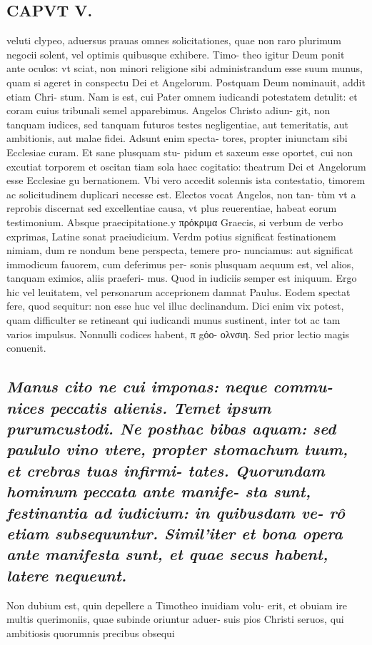 \documentclass{article}
\begin{document}
\begin{pages}
\section*{CAPVT V. }
\marginpar{[ p.69 ]}\pstart veluti clypeo, aduersus prauas omnes solicitationes, quae non raro plurimum negocii solent, vel optimis quibusque exhibere. Timo- theo igitur Deum ponit ante oculos: vt sciat, non minori religione sibi administrandum esse suum munus, quam si ageret in conspectu Dei et Angelorum. Postquam Deum nominauit, addit etiam Chri- stum. Nam is est, cui Pater omnem iudicandi potestatem detulit: et coram cuius tribunali semel apparebimus. Angelos Christo adiun- git, non tanquam iudices, sed tanquam futuros testes negligentiae, aut temeritatis, aut ambitionis, aut malae fidei. Adsunt enim specta- tores, propter iniunctam sibi Ecclesiae curam. Et sane plusquam stu- pidum et saxeum esse oportet, cui non excutiat torporem et oscitan tiam sola haec cogitatio: theatrum Dei et Angelorum esse Ecclesiae gu bernationem. Vbi vero accedit solennis ista contestatio, timorem ac solicitudinem duplicari necesse est. Electos vocat Angelos, non tan- tùm vt a reprobis discernat sed excellentiae causa, vt plus reuerentiae, habeat eorum testimonium.  \pend\pstart Absque praecipitatione.y πρόκριμα Graecis, si verbum de verbo exprimas, Latine sonat praeiudicium. Verdm potius significat festinationem nimiam, dum re nondum bene perspecta, temere pro- nunciamus: aut significat immodicum fauorem, cum deferimus per- sonis plusquam aequum est, vel alios, tanquam eximios, aliis praeferi- mus. Quod in iudiciis semper est iniquum. Ergo hic vel leuitatem, vel personarum acceprionem damnat Paulus. Eodem spectat fere, quod sequitur: non esse huc vel illuc declinandum. Dici enim vix potest, quam difficulter se retineant qui iudicandi munus sustinent, inter tot ac tam varios impulsus. Nonnulli codices habent, π gόο- ολνσιη. Sed prior lectio magis conuenit.  \pend
{}
{}
\subsection*{\textit{Manus cito ne cui imponas: neque commu- nices peccatis alienis. Temet ipsum purumcustodi. Ne posthac bibas aquam: sed paululo vino vtere, propter stomachum tuum, et crebras tuas infirmi- tates. Quorundam hominum peccata ante manife- sta sunt, festinantia ad iudicium: in quibusdam ve- rô etiam subsequuntur. Simil’iter et bona opera ante manifesta sunt, et quae secus habent, latere nequeunt. }}\pstart Non dubium est, quin depellere a Timotheo inuidiam volu- erit, et obuiam ire multis querimoniis, quae subinde oriuntur aduer- suis pios Christi seruos, qui ambitiosis quorumnis precibus obsequi  \pend

\end{pages}
\end{document}
